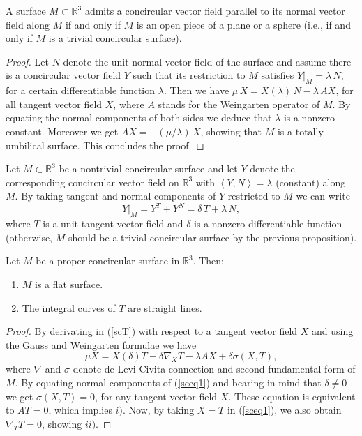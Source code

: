 \documentclass[eqnumis, pdf]{hjms}
\def\R#1{\ensuremath{\mathbb{R}^{#1}}}
\def\<{\left<}
\def\>{\right>}
\begin{document}
\begin{proposition}\label{propcs1}
A surface $M\subset\R{3}$ admits a concircular vector field parallel to its normal vector field along $M$ if and only if $M$ is an open piece of a plane or a sphere (i.e., if and only if $M$ is a trivial concircular surface).
\end{proposition}
\begin{proof}
Let $N$ denote the unit normal vector field of the surface and assume there is a concircular vector field $Y$ such that its restriction to $M$ satisfies $Y|_M=\lambda\,N$, for a certain differentiable function $\lambda$. Then we have
$\mu\,X=X(\lambda)\,N-\lambda\,AX$,
for all tangent vector field $X$, where $A$ stands for the Weingarten operator of $M$. By equating the normal components of both sides we deduce that $\lambda$ is a nonzero constant. Moreover we get
$AX=-(\mu/\lambda)\,X$,
showing that $M$ is a totally umbilical surface. This concludes the proof.
\end{proof}

Let $M\subset\R{3}$ be a nontrivial concircular surface and let $Y$ denote the corresponding concircular vector field on $\R{3}$ with $\<Y,N\>=\lambda$ (constant) along $M$. By taking tangent and normal components of $Y$ restricted to $M$ we can write
\begin{equation}\label{scT}
Y|_M=Y^T+Y^N=\delta\,T+\lambda\,N,
\end{equation}
where $T$ is a unit tangent vector field and $\delta$ is a nonzero differentiable function (otherwise, $M$ should be a trivial concircular surface by the previous proposition).
\begin{proposition}\label{propcs2}
Let $M$ be a proper concircular surface in $\R3$. Then:\vspace*{-\topsep}
\begin{enumerate}\itemsep0pt
\item[$i)$] $M$ is a flat surface.
\item[$ii)$] The integral curves of $T$ are straight lines.
\end{enumerate}
\end{proposition}
\begin{proof}
By derivating in (\ref{scT}) with respect to a tangent vector field $X$ and using the Gauss and Weingarten formulae we have
\begin{equation}\label{sceq1}
\mu X=X(\delta)T+\delta\nabla_XT-\lambda AX+\delta\sigma(X,T),
\end{equation}
where $\nabla$ and $\sigma$ denote de Levi-Civita connection and second fundamental form of $M$. By equating normal components of (\ref{sceq1}) and bearing in mind that $\delta\neq0$ we get
$\sigma(X,T)=0$,
for any tangent vector field $X$. These equation is equivalent to
$AT=0$, which implies $i)$.
Now, by taking $X=T$ in (\ref{sceq1}), %
we also obtain
$\nabla_TT=0$,
showing $ii)$.
\end{proof}
\medskip
\end{document}
